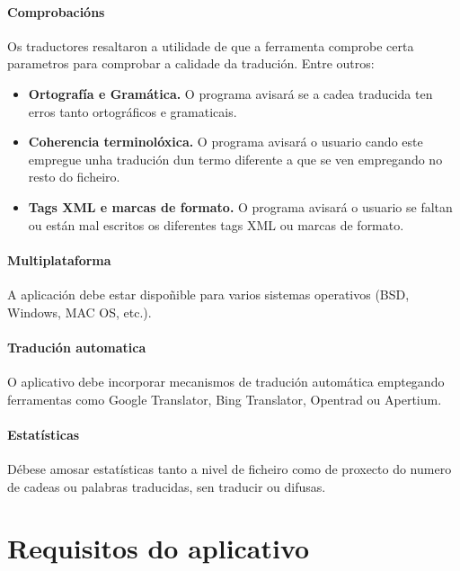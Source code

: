 	\paragraph{Comprobacións} Os traductores resaltaron a utilidade de que a ferramenta comprobe certa parametros para comprobar a calidade da tradución. Entre outros:
		\begin{itemize}
			\item \textbf{Ortografía e Gramática.} O programa avisará se a cadea traducida ten erros tanto ortográficos e gramaticais.
			\item \textbf{Coherencia terminolóxica.} O programa avisará o usuario cando este empregue unha tradución dun termo diferente a que se ven empregando no resto do ficheiro.
			\item \textbf{Tags XML e marcas de formato.} O programa avisará o usuario se faltan ou están mal escritos os diferentes tags XML ou marcas de formato.
		\end{itemize}

	\paragraph{Multiplataforma} A aplicación debe estar dispoñible para varios sistemas operativos (BSD, Windows, MAC OS, etc.).

	\paragraph{Tradución automatica} O aplicativo debe incorporar mecanismos de tradución automática emptegando ferramentas como Google Translator, Bing Translator, Opentrad ou Apertium.

	\paragraph{Estatísticas} Débese amosar estatísticas tanto a nivel de ficheiro como de proxecto do numero de cadeas ou palabras traducidas, sen traducir ou difusas.

\section{Requisitos do aplicativo}

%
%